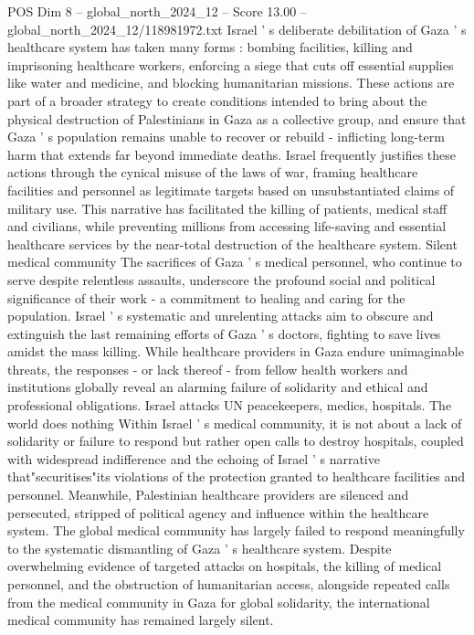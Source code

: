 \begin{textsample}{POS Dim 8 – global\_north\_2024\_12 – Score 13.00 – global\_north\_2024\_12/118981972.txt}
Israel ' s deliberate debilitation of Gaza ' s healthcare system has taken many forms : bombing facilities, killing and imprisoning healthcare workers, enforcing a siege that cuts off essential supplies like water and medicine, and blocking humanitarian missions.
These actions are part of a broader strategy to create conditions intended to bring about the physical destruction of Palestinians in Gaza as a collective group, and ensure that Gaza ' s population remains unable to recover or rebuild - inflicting long-term harm that extends far beyond immediate deaths.
Israel frequently justifies these actions through the cynical misuse of the laws of war, framing healthcare facilities and personnel as legitimate targets based on unsubstantiated claims of military use.
This narrative has facilitated the killing of patients, medical staff and civilians, while preventing millions from accessing life-saving and essential healthcare services by the near-total destruction of the healthcare system.
Silent medical community The sacrifices of Gaza ' s medical personnel, who continue to serve despite relentless assaults, underscore the profound social and political significance of their work - a commitment to healing and caring for the population.
Israel ' s systematic and unrelenting attacks aim to obscure and extinguish the last remaining efforts of Gaza ' s doctors, fighting to save lives amidst the mass killing.
While healthcare providers in Gaza endure unimaginable threats, the responses - or lack thereof - from fellow health workers and institutions globally reveal an alarming failure of solidarity and ethical and professional obligations.
Israel attacks UN peacekeepers, medics, hospitals.
The world does nothing Within Israel ' s medical community, it is not about a lack of solidarity or failure to respond but rather open calls to destroy hospitals, coupled with widespread indifference and the echoing of Israel ' s narrative that"securitises"its violations of the protection granted to healthcare facilities and personnel.
Meanwhile, Palestinian healthcare providers are silenced and persecuted, stripped of political agency and influence within the healthcare system.
The global medical community has largely failed to respond meaningfully to the systematic dismantling of Gaza ' s healthcare system.
Despite overwhelming evidence of targeted attacks on hospitals, the killing of medical personnel, and the obstruction of humanitarian access, alongside repeated calls from the medical community in Gaza for global solidarity, the international medical community has remained largely silent.

\end{textsample}
